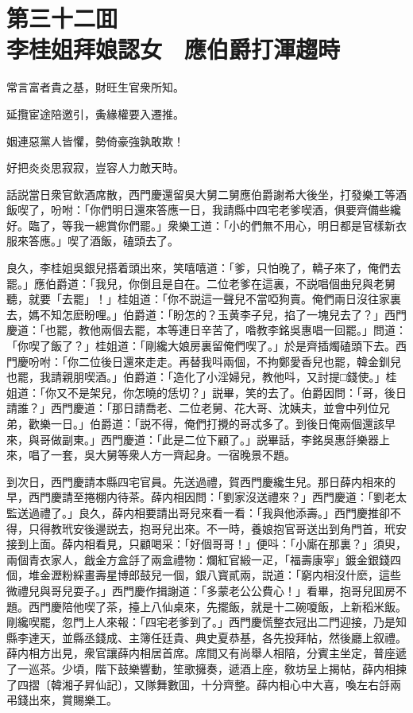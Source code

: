 
\chapter*{第三十二囬　\\李桂姐拜娘認女　應伯爵打渾趨時}


\begin{myquote}
常言富者貴之基，財旺生官衆所知。

延攬宦途陪邀引，夤緣權要入遷推。

姻連惡黨人皆懼，勢倚豪強孰敢欺！

好把炎炎思寂寂，豈容人力敵天時。
\end{myquote}

話説當日衆官飲酒席散，西門慶還留吳大舅二舅應伯爵謝希大後坐，打發樂工等酒飯喫了，吩咐：「你們明日還來答應一日，我請縣中四宅老爹喫酒，俱要齊備些纔好。臨了，等我一總賞你們罷。」衆樂工道：「小的們無不用心，明日都是官樣新衣服來答應。」喫了酒飯，磕頭去了。

良久，李桂姐吳銀兒搭着頭出來，笑嘻嘻道：「爹，只怕晚了，轎子來了，俺們去罷。」應伯爵道：「我兒，你倒且是自在。二位老爹在這裏，不説唱個曲兒與老舅聽，就要「去罷」！」桂姐道：「你不説這一聲兒不當啞狗賣。俺們兩日沒往家裏去，媽不知怎麽盼哩。」伯爵道：「盼怎的？玉黄李子兒，掐了一塊兒去了？」西門慶道：「也罷，教他兩個去罷，本等連日辛苦了，喒教李銘吳惠唱一回罷。」問道：「你喫了飯了？」桂姐道：「剛纔大娘房裏留俺們喫了。」於是齊插燭磕頭下去。西門慶吩咐：「你二位後日還來走走。再替我呌兩個，不拘鄭愛香兒也罷，韓金釧兒也罷，我請親朋喫酒。」伯爵道：「造化了小淫婦兒，教他呌，又討提□錢使。」桂姐道：「你又不是架兒，你怎曉的恁切？」説畢，笑的去了。伯爵因問：「哥，後日請誰？」西門慶道：「那日請喬老、二位老舅、花大哥、沈姨夫，並會中列位兄弟，歡樂一日。」伯爵道：「説不得，俺們打攪的哥忒多了。到後日俺兩個還該早來，與哥做副東。」西門慶道：「此是二位下顧了。」説畢話，李銘吳惠㧱樂器上來，唱了一套，吳大舅等衆人方一齊起身。一宿晚景不題。

到次日，西門慶請本縣四宅官員。先送過禮，賀西門慶纔生兒。那日薛内相來的早，西門慶請至捲棚内待茶。薛内相因問：「劉家沒送禮來？」西門慶道：「劉老太監送過禮了。」良久，薛内相要請出哥兒來看一看：「我與他添壽。」西門慶推卻不得，只得教玳安後邊説去，抱哥兒出來。不一時，養娘抱官哥送出到角門首，玳安接到上面。薛内相看見，只顧喝采：「好個哥哥！」便呌：「小廝在那裏？」須臾，兩個青衣家人，戧金方盒㧱了兩盒禮物：爛紅官緞一疋，「福壽康寜」鍍金銀錢四個，堆金瀝粉綵畫壽星博郎鼓兒一個，銀八寳貳兩，説道：「窮内相沒什麽，這些微禮兒與哥兒耍子。」西門慶作揖謝道：「多蒙老公公費心！」看畢，抱哥兒囬房不題。西門慶陪他喫了茶，擡上八仙桌來，先擺飯，就是十二碗嗄飯，上新稻米飯。剛纔喫罷，忽門上人來報：「四宅老爹到了。」西門慶慌整衣冠出二門迎接，乃是知縣李達天，並縣丞錢成、主簿任廷貴、典史夏恭基，各先投拜帖，然後廳上叙禮。薛内相方出見，衆官讓薛内相居首席。席間又有尚舉人相陪，分賓主坐定，普座遞了一巡茶。少頃，階下鼓樂響動，笙歌擁奏，遞酒上座，敎坊呈上揭帖，薛内相揀了四摺〔韓湘子昇仙記〕，又隊舞數囬，十分齊整。薛内相心中大喜，喚左右㧱兩弔錢出來，賞賜樂工。

